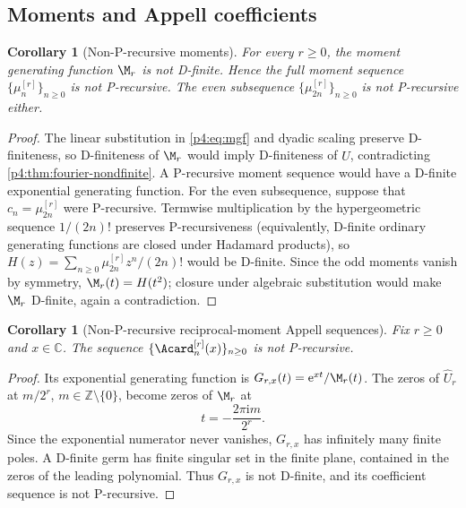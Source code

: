 \documentclass[11pt]{article}
\numberwithin{equation}{section}
\newtheorem{corollary}[theorem]{Corollary}
\theoremstyle{definition}
\theoremstyle{remark}
\newcommand{\Z}{\mathbb Z}
\newcommand{\C}{\mathbb C}
\newcommand{\e}{\mathrm e}
\newcommand{\ii}{\mathrm i}
\begin{document}
\subsection{Moments and Appell coefficients}
\begin{corollary}[Non-P-recursive moments]
\label{p4:cor:moments-nonP}
For every $r\ge0$, the moment generating function $\M_r$ is not D-finite.  Hence the full moment sequence
$\{\mu_n^{[r]}\}_{n\ge0}$ is not P-recursive.  The even subsequence
$\{\mu_{2n}^{[r]}\}_{n\ge0}$ is not P-recursive either.
\end{corollary}

\begin{proof}
The linear substitution in \eqref{p4:eq:mgf} and dyadic scaling preserve D-finiteness, so D-finiteness of $\M_r$ would imply D-finiteness of $\widehat U$, contradicting \cref{p4:thm:fourier-nondfinite}.  A P-recursive moment sequence would have a D-finite exponential generating function.  For the even subsequence, suppose that $c_n=\mu_{2n}^{[r]}$ were P-recursive.  Termwise multiplication by the hypergeometric sequence $1/(2n)!$ preserves P-recursiveness (equivalently, D-finite ordinary generating functions are closed under Hadamard products), so
$H(z)=\sum_{n\ge0}\mu_{2n}^{[r]}z^n/(2n)!$ would be D-finite.  Since the odd moments vanish by symmetry, $\M_r(t)=H(t^2)$; closure under algebraic substitution would make $\M_r$ D-finite, again a contradiction.
\end{proof}

\begin{corollary}[Non-P-recursive reciprocal-moment Appell sequences]
\label{p4:cor:appell-nonP}
Fix $r\ge0$ and $x\in\C$.  The sequence
$\{\Acard_n^{[r]}(x)\}_{n\ge0}$ is not P-recursive.
\end{corollary}

\begin{proof}
Its exponential generating function is $G_{r,x}(t)=\e^{xt}/\M_r(t)$.  The zeros of $\widehat U_r$ at $m/2^r$, $m\in\Z\setminus\{0\}$, become zeros of $\M_r$ at
\begin{equation}
 t=-\frac{2\pi\ii m}{2^r}.
 \label{p4:eq:mgf-zeros}
\end{equation}
Since the exponential numerator never vanishes, $G_{r,x}$ has infinitely many finite poles.  A D-finite germ has finite singular set in the finite plane, contained in the zeros of the leading polynomial.  Thus $G_{r,x}$ is not D-finite, and its coefficient sequence is not P-recursive.
\end{proof}
\end{document}
